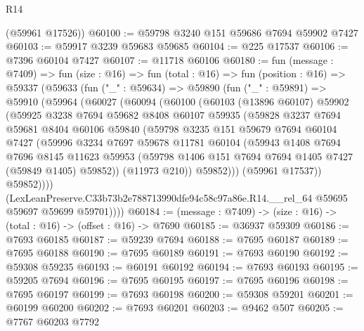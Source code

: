 \begin{lexlean}{R14}
\begin{coremodule}
      (@59961 @17526))
@60100 := @59798 @3240 @151 @59686 @7694 @59902 @7427
@60103 := @59917 @3239 @59683 @59685
@60104 := @225 @17537
@60106 := @7396 @60104 @7427
@60107 := @11718 @60106
@60180 := fun (message : @7409) =>
  fun (size : @16) =>
  fun (total : @16) =>
  fun (position : @16) =>
  @59337
    (@59633
      (fun ("_" : @59634) =>
      @59890
        (fun ("_" : @59891) =>
        @59910
          (@59964
            (@60027
              (@60094
                (@60100
                  (@60103
                    (@13896 @60107)
                    @59902
                    (@59925
                      @3238
                      @7694
                      @59682
                      @8408
                      @60107
                      @59935
                      (@59828
                        @3237
                        @7694
                        @59681
                        @8404
                        @60106
                        @59840
                        (@59798
                          @3235
                          @151
                          @59679
                          @7694
                          @60104
                          @7427
                          (@59996
                            @3234
                            @7697
                            @59678
                            @11781
                            @60104
                            (@59943
                              @1408
                              @7694
                              @7696
                              @8145
                              @11623
                              @59953
                              (@59798 @1406 @151 @7694 @7694 @1405 @7427 (@59849 @1405) @59852))
                            (@11973 @210))
                          @59852)))
                    (@59961 @17537))
                  @59852))))
          (LexLeanPreserve.C33b73b2e788713990dfe94c58c97a86e.R14.__rel_64
            @59695
            @59697
            @59699
            @59701))))
@60184 := (message : @7409) -> (size : @16) -> (total : @16) -> (offset : @16) -> @7690
@60185 := @36937 @59309
@60186 := @7693 @60185
@60187 := @59239 @7694
@60188 := @7695 @60187
@60189 := @7695 @60188
@60190 := @7695 @60189
@60191 := @7693 @60190
@60192 := @59308 @59235
@60193 := @60191 @60192
@60194 := @7693 @60193
@60195 := @59205 @7694
@60196 := @7695 @60195
@60197 := @7695 @60196
@60198 := @7695 @60197
@60199 := @7693 @60198
@60200 := @59308 @59201
@60201 := @60199 @60200
@60202 := @7693 @60201
@60203 := @9462 @507
@60205 := @7767 @60203 @7792

\end{coremodule}
\end{lexlean}
